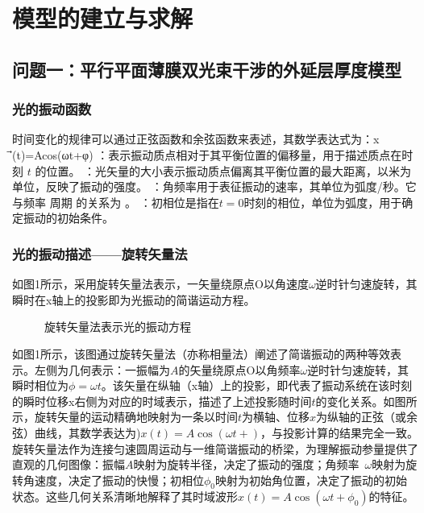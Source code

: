\documentclass{ctexart}
\begin{document}
\section{模型的建立与求解}

\subsection{问题一：平行平面薄膜双光束干涉的外延层厚度模型}

\subsubsection{光的振动函数}
时间变化的规律可以通过正弦函数和余弦函数来表述，其数学表达式为：x ⃗(t)=Acos⁡(ωt+φ)
：表示振动质点相对于其平衡位置的偏移量，用于描述质点在时刻 $t$ 的位置。
：光矢量的大小表示振动质点偏离其平衡位置的最大距离，以米为单位，反映了振动的强度。
：角频率用于表征振动的速率，其单位为弧度/秒。它与频率  周期  的关系为 。
：初相位是指在$t=0$时刻的相位，单位为弧度，用于确定振动的初始条件。

\subsubsection{光的振动描述——旋转矢量法}
如图1所示，采用旋转矢量法表示，一矢量绕原点O以角速度$\omega$逆时针匀速旋转，其瞬时在x轴上的投影即为光振动的简谐运动方程。

\begin{figure}[ht]
    \centering
    \fbox{\rule{2cm}{0pt} \rule{0pt}{2cm}} %
    \caption{旋转矢量法表示光的振动方程}
    \label{fig:1}
\end{figure}

如图1所示，该图通过旋转矢量法（亦称相量法）阐述了简谐振动的两种等效表示。左侧为几何表示：一振幅为$A$的矢量绕原点O以角频率$\omega$逆时针匀速旋转，其瞬时相位为$\phi=\omega t$。该矢量在纵轴（x轴）上的投影，即代表了振动系统在该时刻的瞬时位移x右侧为对应的时域表示，描述了上述投影随时间$t$的变化关系。如图所示，旋转矢量的运动精确地映射为一条以时间$t$为横轴、位移$x$为纵轴的正弦（或余弦）曲线，其数学表达为)$x(t)=A\cos(\omega t+)$，与投影计算的结果完全一致。
旋转矢量法作为连接匀速圆周运动与一维简谐振动的桥梁，为理解振动参量提供了直观的几何图像：振幅$A$映射为旋转半径，决定了振动的强度；角频率 $\omega$映射为旋转角速度，决定了振动的快慢；初相位$\phi_0$映射为初始角位置，决定了振动的初始状态。这些几何关系清晰地解释了其时域波形$x(t)=A\cos(\omega t+\phi_0)$的特征。
\end{document}
